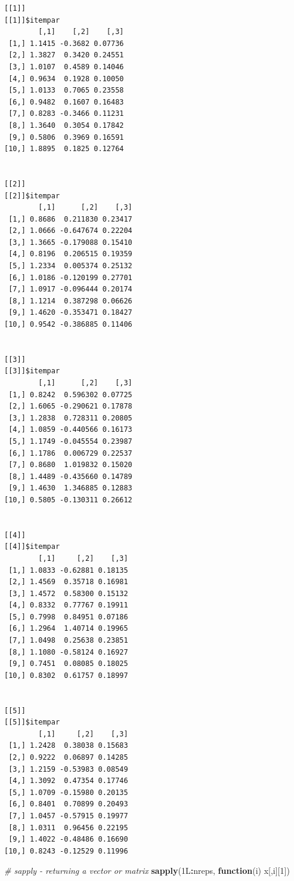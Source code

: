 \documentclass[
]{book}
\newenvironment{Shaded}{\begin{snugshade}}{\end{snugshade}}
\newcommand{\CommentTok}[1]{\textcolor[rgb]{0.56,0.35,0.01}{\textit{#1}}}
\newcommand{\ControlFlowTok}[1]{\textcolor[rgb]{0.13,0.29,0.53}{\textbf{#1}}}
\newcommand{\DecValTok}[1]{\textcolor[rgb]{0.00,0.00,0.81}{#1}}
\newcommand{\KeywordTok}[1]{\textcolor[rgb]{0.13,0.29,0.53}{\textbf{#1}}}
\newcommand{\NormalTok}[1]{#1}
\newcommand{\OperatorTok}[1]{\textcolor[rgb]{0.81,0.36,0.00}{\textbf{#1}}}
\begin{document}
\begin{verbatim}
[[1]]
[[1]]$itempar
        [,1]    [,2]    [,3]
 [1,] 1.1415 -0.3682 0.07736
 [2,] 1.3827  0.3420 0.24551
 [3,] 1.0107  0.4589 0.14046
 [4,] 0.9634  0.1928 0.10050
 [5,] 1.0133  0.7065 0.23558
 [6,] 0.9482  0.1607 0.16483
 [7,] 0.8283 -0.3466 0.11231
 [8,] 1.3640  0.3054 0.17842
 [9,] 0.5806  0.3969 0.16591
[10,] 1.8895  0.1825 0.12764


[[2]]
[[2]]$itempar
        [,1]      [,2]    [,3]
 [1,] 0.8686  0.211830 0.23417
 [2,] 1.0666 -0.647674 0.22204
 [3,] 1.3665 -0.179088 0.15410
 [4,] 0.8196  0.206515 0.19359
 [5,] 1.2334  0.005374 0.25132
 [6,] 1.0186 -0.120199 0.27701
 [7,] 1.0917 -0.096444 0.20174
 [8,] 1.1214  0.387298 0.06626
 [9,] 1.4620 -0.353471 0.18427
[10,] 0.9542 -0.386885 0.11406


[[3]]
[[3]]$itempar
        [,1]      [,2]    [,3]
 [1,] 0.8242  0.596302 0.07725
 [2,] 1.6065 -0.290621 0.17878
 [3,] 1.2838  0.728311 0.20805
 [4,] 1.0859 -0.440566 0.16173
 [5,] 1.1749 -0.045554 0.23987
 [6,] 1.1786  0.006729 0.22537
 [7,] 0.8680  1.019832 0.15020
 [8,] 1.4489 -0.435660 0.14789
 [9,] 1.4630  1.346885 0.12883
[10,] 0.5805 -0.130311 0.26612


[[4]]
[[4]]$itempar
        [,1]     [,2]    [,3]
 [1,] 1.0833 -0.62881 0.18135
 [2,] 1.4569  0.35718 0.16981
 [3,] 1.4572  0.58300 0.15132
 [4,] 0.8332  0.77767 0.19911
 [5,] 0.7998  0.84951 0.07186
 [6,] 1.2964  1.40714 0.19965
 [7,] 1.0498  0.25638 0.23851
 [8,] 1.1080 -0.58124 0.16927
 [9,] 0.7451  0.08085 0.18025
[10,] 0.8302  0.61757 0.18997


[[5]]
[[5]]$itempar
        [,1]     [,2]    [,3]
 [1,] 1.2428  0.38038 0.15683
 [2,] 0.9222  0.06897 0.14285
 [3,] 1.2159 -0.53983 0.08549
 [4,] 1.3092  0.47354 0.17746
 [5,] 1.0709 -0.15980 0.20135
 [6,] 0.8401  0.70899 0.20493
 [7,] 1.0457 -0.57915 0.19977
 [8,] 1.0311  0.96456 0.22195
 [9,] 1.4022 -0.48486 0.16690
[10,] 0.8243 -0.12529 0.11996
\end{verbatim}

\begin{Shaded}
\begin{Highlighting}[]
\CommentTok{# sapply - returning a vector or matrix}
\KeywordTok{sapply}\NormalTok{(1L}\OperatorTok{:}\NormalTok{nreps, }\ControlFlowTok{function}\NormalTok{(i) x[,i][}\DecValTok{1}\NormalTok{])}
\end{Highlighting}
\end{Shaded}
\end{document}
